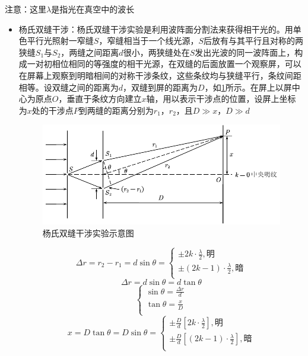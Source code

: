 \documentclass[12pt, a4paper, twoside]{ctexbook}
\begin{document}
{\sonti 注意}：这里$\lambda$是指光在真空中的波长
\begin{itemize}
    \item {\sonti 杨氏双缝干涉}：杨氏双缝干涉实验是利用波阵面分割法来获得相干光的。用单色平行光照射一窄缝$S$，窄缝相当于一个线光源，$S$后放有与其平行且对称的两狭缝$S_1$与$S_2$，两缝之间距离$d$很小，两狭缝处在$S$发出光波的同一波阵面上，构成一对初相位相同的等强度的相干光源，在双缝的后面放置一个观察屏，可以在屏幕上观察到明暗相间的对称干涉条纹，这些条纹均与狭缝平行，条纹间距相等。设双缝之间的距离为$d$，双缝到屏的距离为$D$，如\textcolor{blue}{\cref{fig:杨氏双缝干涉}}所示。在屏上以屏中心为原点$O$，垂直于条纹方向建立$x$轴，用以表示干涉点的位置，设屏上坐标为$x$处的干涉点$P$到两缝的距离分别为$r_1$，$r_2$，且$D\gg x$，$D\gg d$
    \begin{figure}[H]
        \centerline{\includegraphics[scale=0.88]{杨氏双缝干涉.pdf}}
        \caption{杨氏双缝干涉实验示意图}\label{fig:杨氏双缝干涉}
    \end{figure}
    $$
    \Delta r=r_2-r_1=d\sin\theta=\left\{ \begin{array}{l}
        \pm 2k\cdot \frac{\lambda}{2},\text{明}\\
        \pm \left( 2k-1 \right) \cdot \frac{\lambda}{2},\text{暗}\\
    \end{array} \right. 
    $$
    $$
    \Delta r=d\sin\theta=d\tan\theta
    $$
    $$
    \left\{ \begin{array}{l}
        \sin \theta =\frac{\Delta r}{d}\\
        \tan \theta =\frac{x}{D}\\
    \end{array} \right. 
    $$
    $$
    x=D\tan\theta=D\sin\theta=\left\{ \begin{array}{l}
        \pm \frac{D}{d}\left[ 2k\cdot \frac{\lambda}{2} \right] ,\text{明}\\
        \pm \frac{D}{d}\left[ \left( 2k-1 \right) \cdot \frac{\lambda}{2} \right] ,\text{暗}\\

\end{array}$$
\end{itemize}
\end{document}
